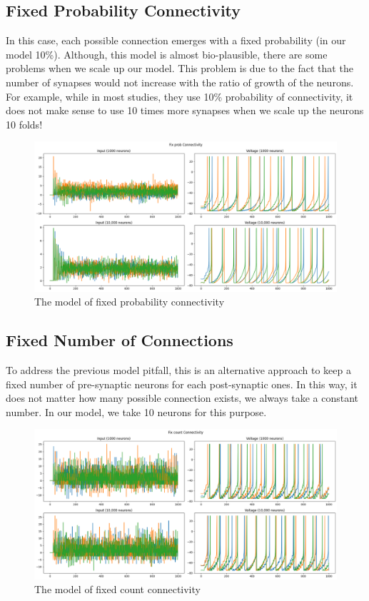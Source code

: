 \documentclass{article}
\begin{document}
	\subsection{Fixed Probability Connectivity}
	In this case, each possible connection emerges with a fixed probability (in our model 10\%). Although, this model is almost bio-plausible, there are some problems when we scale up our model. This problem is due to the fact that the number of synapses would not increase with the ratio of growth of the neurons. For example, while in most studies, they use 10\% probability of connectivity, it does not make sense to use 10 times more synapses when we scale up the neurons 10 folds!
	
	\begin{figure}[h]
		\includegraphics[width=1.2\textwidth]{fixProbCon.png}
		\caption{The model of fixed probability connectivity}
		\label{fixProb}
	\end{figure}
	
	\subsection{Fixed Number of Connections}
	To address the previous model pitfall, this is an alternative approach to keep a fixed number of pre-synaptic neurons for each post-synaptic ones. In this way, it does not matter how many possible connection exists, we always take a constant number. In our model, we take 10 neurons for this purpose.
	
	\begin{figure}[h]
		\includegraphics[width=1.2\textwidth]{fixCountCon.png}
		\caption{The model of fixed count connectivity}
		\label{fixCount}
	\end{figure}
	
\end{document}

